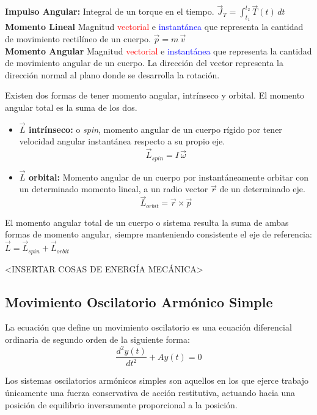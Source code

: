\documentclass[12pt,a4paper]{article}
\begin{document}
\textbf{Impulso Angular:} Integral de un torque en el tiempo. $\displaystyle  \vec{J}_T=\int_{t_1}^{t_2}\vec{T}(t)\, dt$ \\

\textbf{Momento Lineal} Magnitud \textcolor{red}{vectorial} e \textcolor{blue}{instantánea} que representa la cantidad de movimiento rectilíneo de un cuerpo. $\displaystyle \vec{p}=m \, \vec{v}$ \\

\textbf{Momento Angular} Magnitud \textcolor{red}{vectorial} e \textcolor{blue}{instantánea} que representa la cantidad de movimiento angular de un cuerpo. La dirección del vector representa la dirección normal al plano donde se desarrolla la rotación.

Existen dos formas de tener momento angular, intrínseco y orbital. El momento angular total es la suma de los dos.

\begin{itemize}
	\item \textbf{$\vec{L}$ intrínseco:} o \textit{spin}, momento angular de un cuerpo rígido por tener velocidad angular instantánea respecto a su propio eje. $$\vec{L}_{spin} = I \, \vec{\omega}$$
	

	\item \textbf{$\vec{L}$ orbital:} Momento angular de un cuerpo por instantáneamente orbitar con un determinado momento lineal, a un radio vector $\vec{r}$ de un determinado eje. $$\vec{L}_{orbit} = \vec{r} \times \vec{p}$$
\end{itemize}

El momento angular total de un cuerpo o sistema resulta la suma de ambas formas de momento angular, siempre manteniendo consistente el eje de referencia: $\displaystyle \vec{L}=\vec{L}_{spin}+\vec{L}_{orbit}$


<INSERTAR COSAS DE ENERGÍA MECÁNICA> \\

\newpage
\subsection{Movimiento Oscilatorio Armónico Simple} 
La ecuación que define un movimiento oscilatorio es una ecuación diferencial ordinaria de segundo orden de la siguiente forma:
$$\dfrac{d^2y(t)}{dt^2} + A y(t) = 0$$

Los sistemas oscilatorios armónicos simples son aquellos en los que ejerce trabajo únicamente una fuerza conservativa de acción restitutiva, actuando hacia una posición de equilibrio inversamente proporcional a la posición.\\
\end{document}
